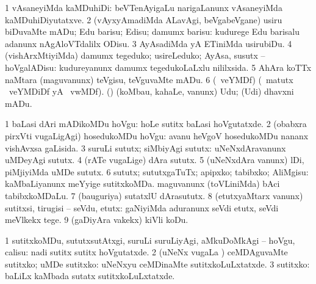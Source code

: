 {{{{{{\bentry
{}
\gl{\sakirx}
\bmng
\bnum
\num{1} vAsaneyiMda kaMDuhiDi:  beVTenAyigaLu narigaLanunx vAsaneyiMda kaMDuhiDiyutatxve. 
\num{2} (vAyxyAmadiMda ALavAgi, beVgabeVgane) usiru biDuvaMte mADu; Edu barisu; Edisu; damumx barisu:  kudurege Edu barisalu adanunx nAgAloVTdalilx ODisu. 
\num{3} AyAsadiMda yA ETiniMda usirubiDu. 
\num{4} (vishArxMtiyiMda) damumx tegeduko; usireLeduko; AyAsa, susutx -- hoVgalADisu:  kudureyanunx damumx tegedukoLaLxlu nililxsida. 
\num{5} AhAra koTTx naMtara (maguvanunx) teVgisu, teVguvaMte mADu. 
\num{6} (\ucAcx\ veYMDf) (\BU\ matutx \BUkaq\  \ucAcx\ veYMDiDf yA  \ucAcx\ vwMDf). (\kAparx) (koMbau, kahaLe, \mo vanunx) Udu; (Udi) dhavxni mADu. 
\enum
\emng
\eentry

\bentry
{}
\gl{\sakirx}
\bmng
\bnum
\num{1} baLasi dAri mADikoMDu hoVgu:  hoLe sutitx baLasi hoVgutatxde. 
\num{2} (obabxra pirxVti \mo vugaLigAgi) hosedukoMDu hoVgu:  avanu heVgoV hosedukoMDu nananx vishAvxsa gaLisida. 
\num{3} suruLi sututx; siMbiyAgi sututx:  uNeNxdAravanunx uMDeyAgi sututx. 
\num{4} (rATe \mo vugaLige) dAra sututx. 
\num{5} (uNeNxdAra \mo vanunx) lDi, piMjiyiMda uMDe sututx. 
\num{6} sututx; sututxgaTuTx; apipxko; tabibxko; AliMgisu:  kaMbaLiyanunx meYyige sutitxkoMDa.  maguvanunx (toVLiniMda) bAci tabibxkoMDaLu. 
\num{7} (bauguriya) sutatxlU dArasututx. 
\num{8} (etutxyaMtarx \mo vanunx) sutitxsi, tirugisi -- seVdu, etutx:  gaNiyiMda aduranunx seVdi etutx, seVdi meVlkekx tege. 
\num{9} (gaDiyAra \mo vakekx) kiVli koDu. 
\enum
\emng

\noindent
\gl{\akirx}
\bmng
\bnum
\num{1} sutitxkoMDu, sututxsutAtxgi, suruLi suruLiyAgi, aMkuDoMkAgi -- hoVgu, calisu:  nadi sutitx sutitx hoVgutatxde. 
\num{2} (uNeNx \mo vugaLa \vi) ceMDAguvaMte sutitxko; uMDe sutitxko:  uNeNxyu ceMDinaMte sutitxkoLuLxtatxde. 
\num{3} sutitxko:  baLiLx kaMbada sutatx sutitxkoLuLxtatxde. 
\enum
\emng

}}}}}}
